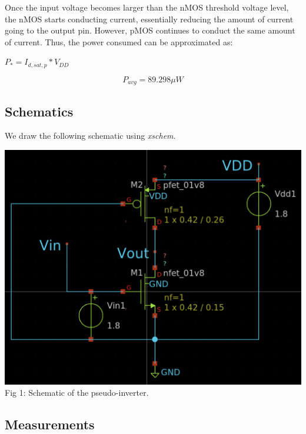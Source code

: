 \documentclass[12pt,a4paper]{article}
\begin{document}
\noindent Once the input voltage becomes larger than the nMOS threshold voltage level, the nMOS starts conducting current, essentially reducing the amount of current going to the output pin. However, pMOS continues to conduct the same amount of current. Thus, the power consumed can be approximated as:

\begin{center}
    $P_* = I_{d,sat,p} * V_{DD}$
\end{center}

\begin{equation}
    \label{eq:expt1-avg-power}
    P_{avg} = 89.298 \mu W
\end{equation}

\subsection{Schematics}
\noindent We draw the following schematic using \emph{xschem}.
\newline
\begin{center}
\includegraphics[scale=0.4]{tut2/reports/media/expt1.sch.png} \\ Fig 1: Schematic of the pseudo-inverter.
\end{center}


\subsection{Measurements}
\end{document}
